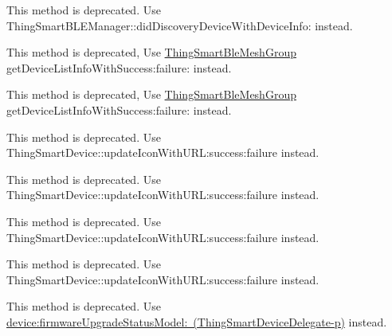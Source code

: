\begin{DoxyRefList}
\label{deprecated__deprecated000132}%
%
This method is deprecated. Use Thing\+Smart\+BLEManager\+::did\+Discovery\+Device\+With\+Device\+Info\+: instead.  
\item[Member \mbox{\hyperlink{interface_thing_smart_ble_mesh_group_a077af1a3c0b83738e565d9edabcd867f}{\mbox{[}Thing\+Smart\+Ble\+Mesh\+Group get\+Devive\+List\+Info\+With\+Success\+:failure\+:\mbox{]}}} ]\label{deprecated__deprecated000094}%
%
This method is deprecated, Use \mbox{\hyperlink{interface_thing_smart_ble_mesh_group}{Thing\+Smart\+Ble\+Mesh\+Group}} get\+Device\+List\+Info\+With\+Success\+:failure\+: instead. 

\label{deprecated__deprecated000092}%
%
This method is deprecated, Use \mbox{\hyperlink{interface_thing_smart_ble_mesh_group}{Thing\+Smart\+Ble\+Mesh\+Group}} get\+Device\+List\+Info\+With\+Success\+:failure\+: instead.  
\item[Member \mbox{\hyperlink{interface_thing_smart_device_a69ca32fecb3dcd2c0ef676a73d5093bd}{\mbox{[}Thing\+Smart\+Device update\+Icon\+With\+Cloud\+Key\+:success\+:failure\+:\mbox{]}}} ]\label{deprecated__deprecated000149}%
%
This method is deprecated. Use Thing\+Smart\+Device\+::update\+Icon\+With\+URL\+:success\+:failure instead. 

\label{deprecated__deprecated000155}%
%
This method is deprecated. Use Thing\+Smart\+Device\+::update\+Icon\+With\+URL\+:success\+:failure instead. 

\label{deprecated__deprecated000137}%
%
This method is deprecated. Use Thing\+Smart\+Device\+::update\+Icon\+With\+URL\+:success\+:failure instead. 

\label{deprecated__deprecated000143}%
%
This method is deprecated. Use Thing\+Smart\+Device\+::update\+Icon\+With\+URL\+:success\+:failure instead.  
\item[Member \mbox{\hyperlink{protocol_thing_smart_device_delegate-p_af3825fae17f3631faf6e86356f6a1e06}{\mbox{[}Thing\+Smart\+Device\+Delegate-\/p device\+:type\+:upgrade\+Status\+:\mbox{]}}} ]\label{deprecated__deprecated000145}%
%
This method is deprecated. Use \mbox{\hyperlink{protocol_thing_smart_device_delegate-p_a7e5c951797795775b302cf8ac688bceb}{device\+:firmware\+Upgrade\+Status\+Model\+: (\+Thing\+Smart\+Device\+Delegate-\/p)}} instead. 


\end{DoxyRefList}
